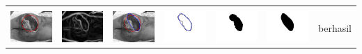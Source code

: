 \begin{table}[H]
\begin{tabular}{|m{0.7in}|m{0.7in}|m{0.7in}|m{0.7in}|m{0.7in}|m{0.7in}|m{0.7in}|}
		&  &  & & & &  \\
		\includegraphics[width=0.7in]{dataset/dataset_3/luka_hitam/ready/41_interp_init.jpg}&
		\includegraphics[width=0.7in]{dataset/dataset_3/luka_hitam/ready/41_interp_ext.jpg}&
		\includegraphics[width=0.7in]{dataset/dataset_3/luka_hitam/ready/41_interp_result.jpg}&
		\includegraphics[width=0.7in]{dataset/dataset_3/luka_hitam/ready/41_gt_r.jpg}&
		\includegraphics[width=0.7in]{dataset/dataset_3/luka_hitam/ready/41_r.jpg}&
		\includegraphics[width=0.7in]{dataset/dataset_3/luka_hitam/ready/41_interp_r.jpg}&
		berhasil\\
		\hline
		
	\end{tabular}
\end{table}

